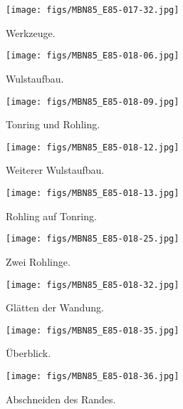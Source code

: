 \begin{figure*}[p]
	\centering
	\begin{subfigure}[t]{0.32\textwidth}
		\centering
		\texttt{[image: figs/MBN85\_E85-017-32.jpg]}
		\caption{Werkzeuge.}
		\label{fig:MBN85_Töpferei_a}
	\end{subfigure}
	\begin{subfigure}[t]{0.32\textwidth}
		\centering
		\texttt{[image: figs/MBN85\_E85-018-06.jpg]}
		\caption{Wulstaufbau.}
		\label{fig:MBN85_Töpferei_b}
	\end{subfigure}
	\begin{subfigure}[t]{0.32\textwidth}
		\centering
		\texttt{[image: figs/MBN85\_E85-018-09.jpg]}
		\caption{Tonring und Rohling.}
		\label{fig:MBN85_Töpferei_d}
	\end{subfigure}
	\begin{subfigure}[t]{0.32\textwidth}
		\centering
		\texttt{[image: figs/MBN85\_E85-018-12.jpg]}
		\caption{Weiterer Wulstaufbau.}
		\label{fig:MBN85_Töpferei_c}
	\end{subfigure}
	\begin{subfigure}[t]{0.32\textwidth}
		\centering
		\texttt{[image: figs/MBN85\_E85-018-13.jpg]}
		\caption{Rohling auf Tonring.}
		\label{fig:MBN85_Töpferei_e}
	\end{subfigure}
	\begin{subfigure}[t]{0.32\textwidth}
		\centering
		\texttt{[image: figs/MBN85\_E85-018-25.jpg]}
		\caption{Zwei Rohlinge.}
		\label{fig:MBN85_Töpferei_f}
	\end{subfigure}
	\begin{subfigure}[t]{0.32\textwidth}
		\centering
		\texttt{[image: figs/MBN85\_E85-018-32.jpg]}
		\caption{Glätten der Wandung.}
		\label{fig:MBN85_Töpferei_g}
	\end{subfigure}
	\begin{subfigure}[t]{0.32\textwidth}
		\centering
		\texttt{[image: figs/MBN85\_E85-018-35.jpg]}
		\caption{Überblick.}
		\label{fig:MBN85_Töpferei_h}
	\end{subfigure}
	\begin{subfigure}[t]{0.32\textwidth}
		\centering
		\texttt{[image: figs/MBN85\_E85-018-36.jpg]}
		\caption{Abschneiden des Randes.}
		\label{fig:MBN85_Töpferei_i}
	\end{subfigure}
	\begin{subfigure}[t]{0.32\textwidth}

\end{subfigure}
\end{figure*}
